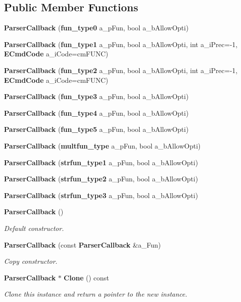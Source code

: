 \subsection*{Public Member Functions}
\begin{CompactItemize}
\item 
{\bf ParserCallback} ({\bf fun\_\-type0} a\_\-pFun, bool a\_\-bAllowOpti)
\item 
{\bf ParserCallback} ({\bf fun\_\-type1} a\_\-pFun, bool a\_\-bAllowOpti, int a\_\-iPrec=-1, {\bf ECmdCode} a\_\-iCode=cmFUNC)
\item 
{\bf ParserCallback} ({\bf fun\_\-type2} a\_\-pFun, bool a\_\-bAllowOpti, int a\_\-iPrec=-1, {\bf ECmdCode} a\_\-iCode=cmFUNC)
\item 
{\bf ParserCallback} ({\bf fun\_\-type3} a\_\-pFun, bool a\_\-bAllowOpti)
\item 
{\bf ParserCallback} ({\bf fun\_\-type4} a\_\-pFun, bool a\_\-bAllowOpti)
\item 
{\bf ParserCallback} ({\bf fun\_\-type5} a\_\-pFun, bool a\_\-bAllowOpti)
\item 
{\bf ParserCallback} ({\bf multfun\_\-type} a\_\-pFun, bool a\_\-bAllowOpti)
\item 
{\bf ParserCallback} ({\bf strfun\_\-type1} a\_\-pFun, bool a\_\-bAllowOpti)
\item 
{\bf ParserCallback} ({\bf strfun\_\-type2} a\_\-pFun, bool a\_\-bAllowOpti)
\item 
{\bf ParserCallback} ({\bf strfun\_\-type3} a\_\-pFun, bool a\_\-bAllowOpti)
\item 
{\bf ParserCallback} ()
\begin{CompactList}\small\item\em Default constructor. \item\end{CompactList}\item 
{\bf ParserCallback} (const {\bf ParserCallback} \&a\_\-Fun)
\begin{CompactList}\small\item\em Copy constructor. \item\end{CompactList}\item 
{\bf ParserCallback} $\ast$ {\bf Clone} () const 
\begin{CompactList}\small\item\em Clone this instance and return a pointer to the new instance. \item\end{CompactList}\item 

\end{CompactItemize}
